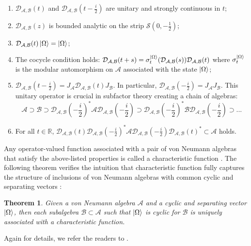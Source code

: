 \documentclass[a4paper,11pt]{article}
\newtheorem{theorem}{Theorem}
\theoremstyle{definition}
\begin{document}
\begin{enumerate}
    \item $\mathcal{D}_{\mathcal{A},\mathcal{B}}(t)$ and $\mathcal{D}_{\mathcal{A}, \mathcal{B}}(t - \frac{i}{2})$ are unitary and strongly continuous in $t$;
    \item $\mathcal{D}_{\mathcal{A},\mathcal{B}}(z)$ is bounded analytic on the strip $\mathcal{S}(0,-\frac{1}{2})$;
    \item $\mathcal{D}_{\mathcal{A},\mathcal{B}}(t)\ket{\Omega} = \ket{\Omega}$;
    \item The cocycle condition holds: $\mathcal{D}_{\mathcal{A},\mathcal{B}}(t+s) = \sigma_t^{\ket{\Omega}}(\mathcal{D}_{\mathcal{A},\mathcal{B}}(s))\mathcal{D}_{\mathcal{A},\mathcal{B}}(t)$ where $\sigma_t^{\ket{\Omega}}$ is the modular automorphism on $\mathcal{A}$ associated with the state $\ket{\Omega}$;
    \item $\mathcal{D}_{\mathcal{A},\mathcal{B}}(t - \frac{i}{2}) = J_\mathcal{A}\mathcal{D}_{\mathcal{A},\mathcal{B}}(t)J_\mathcal{B}$. In particular, $\mathcal{D}_{\mathcal{A},\mathcal{B}}(-\frac{i}{2}) = J_\mathcal{A}J_\mathcal{B}$. This unitary operator is crucial in subfactor theory creating a chain of algebras:
    \begin{equation}
        \mathcal{A}\supset\mathcal{B}\supset\mathcal{D}_{\mathcal{A},\mathcal{B}}(-\frac{i}{2})^*\mathcal{A}\mathcal{D}_{\mathcal{A},\mathcal{B}}(-\frac{i}{2})\supset\mathcal{D}_{\mathcal{A},\mathcal{B}}(-\frac{i}{2})^*\mathcal{B}\mathcal{D}_{\mathcal{A},\mathcal{B}}(-\frac{i}{2})\supset...
    \end{equation}
    \item For all $t\in\mathbb{R}$, $\mathcal{D}_{\mathcal{A},\mathcal{B}}(t)\mathcal{D}_{\mathcal{A},\mathcal{B}}(-\frac{i}{2})^*\mathcal{A}\mathcal{D}_{\mathcal{A},\mathcal{B}}(-\frac{i}{2})\mathcal{D}_{\mathcal{A},\mathcal{B}}(t)^*\subset\mathcal{A}$ holds.
\end{enumerate}
Any operator-valued function associated with a pair of von Neumann algebras that satisfy the above-listed properties is called a characteristic function \cite{revolutionizing}. The following theorem verifies the intuition that characteristic function fully captures the structure of inclusions of von Neumann algebras with common cyclic and separating vectors \cite{revolutionizing}:
\begin{theorem}
    Given a von Neumann algebra $\mathcal{A}$ and a cyclic and separating vector $\ket{\Omega}$, then each subalgebra $\mathcal{B}\subset\mathcal{A}$ such that $\ket{\Omega}$ is cyclic for $\mathcal{B}$ is uniquely associated with a characteristic function.
\end{theorem}
Again for details, we refer the readers to \cite{revolutionizing}.
\end{document}

